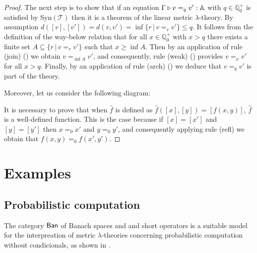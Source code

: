 \documentclass[10pt,a4paper]{amsart}
\theoremstyle{definition}
\theoremstyle{definition}
\theoremstyle{definition}
\theoremstyle{definition}
\theoremstyle{definition}
\theoremstyle{definition}
\begin{document}
\begin{proof}
  The next step is to show that if an equation $\Gamma \triangleright v =_q v' : \mathbb{A}$ with $q \in \mathbb{Q}^{+}_0$ is satisfied by Syn$(\mathscr{T})$ then it is a theorem of the linear metric $\lambda$-theory. By assumption $d([v],[v']) = d(v,v') =  \inf{ \{r \, \vert \, v =_r v'\}} \leq q$. It follows from the definition of the way-below relation that for all
 $x \in \mathbb{Q}^{+}_0$ with $x>q$ there exists a finite set $A \subseteq \{r \, \vert \, v =_r v'\}$ such that $x \geq \inf{A}$. Then by an
 application of rule (join) (\cite[Figure 4]{dahlqvist2023syntactic}) we obtain $v =_{\inf{A}} v'$, and consequently, rule (weak) (\cite[Figure 4]{dahlqvist2023syntactic}) provides $v =_x v'$ for all $x > q$. Finally, by an application of rule (arch) (\cite[Figure 4]{dahlqvist2023syntactic}) we deduce that $v =_q v'$ is part of the theory.

  Moreover, let us consider the following diagram:

  \vspace{10pt}



It is necessary to prove that when $\hat{f}$ is defined as $\hat{f}([x],[y]) = [f(x,y)]$, $\hat{f}$ is a well-defined function. This is the case because if $[x] = [x']$ and $[y] = [y']$ then $x =_0 x'$ and $y =_0 y'$, and consequently applying rule  (refl) we obtain that $f(x,y) =_0 f(x',y')$.
\end{proof} 


\section{Examples}

\subsection{Probabilistic computation}

  The category $\mathsf{Ban}$ of Banach spaces and and short operators is a suitable model for the interpreation of metric $\lambda$-theories
  concerning probabilistic computation without condicionals, as shown in \cite{dahlqvist2023syntactic}. 
  
\end{document}
